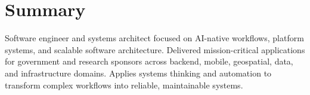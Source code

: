 
\section{Summary}

Software engineer and systems architect focused on AI-native workflows, platform systems, and scalable software architecture. Delivered mission-critical applications for government and research sponsors across backend, mobile, geospatial, data, and infrastructure domains. Applies systems thinking and automation to transform complex workflows into reliable, maintainable systems.
